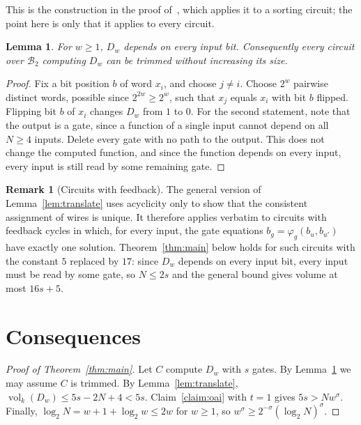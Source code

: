 \documentclass[11pt]{article}
\newtheorem{lemma}[theorem]{Lemma}
\theoremstyle{definition}
\newtheorem{remark}[theorem]{Remark}
\newcommand{\vol}{\operatorname{vol}}
\newcommand{\Dw}{D_w}
\newcommand{\B}{\mathcal{B}_2}
\begin{document}
This is the construction in the proof of~\cite[Proposition~2.3]{OAI-MM}, which applies it to a sorting circuit; the point here is only that it applies to every circuit.

\begin{lemma}\label{lem:depends}
For $w\ge1$, $\Dw$ depends on every input bit. Consequently every circuit over $\B$ computing $\Dw$ can be trimmed without increasing its size.
\end{lemma}

\begin{proof}
Fix a bit position $b$ of word $x_i$, and choose $j\neq i$. Choose $2^w$ pairwise distinct words, possible since $2^{2w}\ge 2^w$, such that $x_j$ equals $x_i$ with bit $b$ flipped. Flipping bit $b$ of $x_i$ changes $\Dw$ from $1$ to $0$. For the second statement, note that the output is a gate, since a function of a single input cannot depend on all $N\ge4$ inputs. Delete every gate with no path to the output. This does not change the computed function, and since the function depends on every input, every input is still read by some remaining gate.
\end{proof}

\begin{remark}[Circuits with feedback]\label{rem:cyclic}
The general version of Lemma~\ref{lem:translate} uses acyclicity only to show that the consistent assignment of wires is unique. It therefore applies verbatim to circuits with feedback cycles in which, for every input, the gate equations $b_g=\varphi_g(b_u,b_{u'})$ have exactly one solution. Theorem~\ref{thm:main} below holds for such circuits with the constant $5$ replaced by $17$: since $\Dw$ depends on every input bit, every input must be read by some gate, so $N\le 2s$ and the general bound gives volume at most $16s+5$.
\end{remark}

\section{Consequences}\label{sec:cons}

\begin{proof}[Proof of Theorem~\ref{thm:main}]
Let $C$ compute $\Dw$ with $s$ gates. By Lemma~\ref{lem:depends} we may assume $C$ is trimmed. By Lemma~\ref{lem:translate}, $\vol_k(\Dw)\le 5s-2N+4 < 5s$. Claim~\ref{claim:oai} with $t=1$ gives $5s > N w^{\sigma}$. Finally, $\log_2 N = w+1+\log_2 w\le 2w$ for $w\ge1$, so $w^{\sigma}\ge 2^{-\sigma}(\log_2N)^{\sigma}$.
\end{proof}
\end{document}
